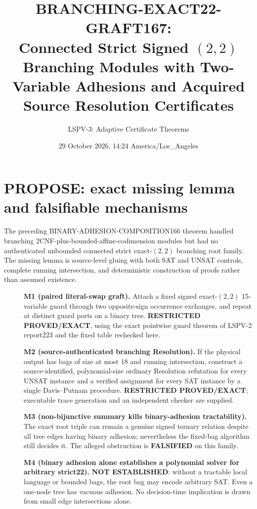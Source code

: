 \documentclass[11pt]{article}
\title{BRANCHING-EXACT22-GRAFT167:\\Connected Strict Signed $(2,2)$ Branching Modules with Two-Variable Adhesions and Acquired Source Resolution Certificates}
\author{LSPV-3: Adaptive Certificate Theorems}
\date{29 October 2026, 14:24 America/Los\_Angeles}
\begin{document}
\maketitle
\begin{center}\end{center}

\section{PROPOSE: exact missing lemma and falsifiable mechanisms}
The preceding BINARY-ADHESION-COMPOSITION166 theorem handled branching 2CNF-plus-bounded-affine-codimension modules but had no authenticated unbounded connected strict exact-$(2,2)$ branching root family. The missing lemma is source-level gluing with both SAT and UNSAT controls, complete running intersection, and deterministic construction of proofs rather than assumed existence.
\begin{description}
\item[]\textbf{M1 (paired literal-swap graft).} Attach a fixed signed exact-$(2,2)$ 15-variable guard through two opposite-sign occurrence exchanges, and repeat at distinct guard ports on a binary tree. \textbf{RESTRICTED PROVED/EXACT}, using the exact pointwise guard theorem of LSPV-2 report223 and the fixed table rechecked here.
\item[]\textbf{M2 (source-authenticated branching Resolution).} If the physical output has bags of size at most 18 and running intersection, construct a source-identified, polynomial-size ordinary Resolution refutation for every UNSAT instance and a verified assignment for every SAT instance by a single Davis--Putnam procedure. \textbf{RESTRICTED PROVED/EXACT}; executable trace generation and an independent checker are supplied.
\item[]\textbf{M3 (non-bijunctive summary kills binary-adhesion tractability).} The exact root triple can remain a genuine signed ternary relation despite all tree edges having binary adhesion; nevertheless the fixed-bag algorithm still decides it. The alleged obstruction is \textbf{FALSIFIED} on this family.
\item[]\textbf{M4 (binary adhesion alone establishes a polynomial solver for arbitrary strict22).} \textbf{NOT ESTABLISHED}: without a tractable local language or bounded bags, the root bag may encode arbitrary SAT. Even a one-node tree has vacuous adhesion. No decision-time implication is drawn from small edge intersections alone.
\end{description}
\end{document}
